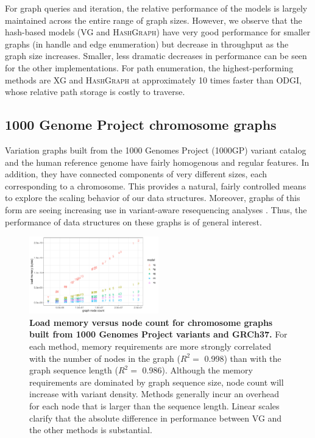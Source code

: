 \documentclass[11pt]{ucthesis}
\begin{document}
For graph queries and iteration, the relative performance of the models is largely maintained across the entire range of graph sizes.
However, we observe that the hash-based models (\textsc{VG} and \textsc{HashGraph}) have very good performance for smaller graphs (in handle and edge enumeration) but decrease in throughput as the graph size increases.
Smaller, less dramatic decreases in performance can be seen for the other implementations.
For path enumeration, the highest-performing methods are \textsc{XG} and \textsc{HashGraph} at approximately 10 times faster than \textsc{ODGI}, whose relative path storage is costly to traverse.

\subsection{1000 Genome Project chromosome graphs}

Variation graphs built from the 1000 Genomes Project (1000GP) variant catalog and the human reference genome have fairly homogenous and regular features.
In addition, they have connected components of very different sizes, each corresponding to a chromosome.
This provides a natural, fairly controlled means to explore the scaling behavior of our data structures.
Moreover, graphs of this form are seeing increasing use in variant-aware resequencing analyses \cite{crysnanto2019sequence}.
Thus, the performance of data structures on these graphs is of general interest.

\begin{figure}[p]
  \centering
  \includegraphics[width=0.5\textwidth]{handlefigures/1000gp_chroms_node_count.pdf}
  \caption{
    \label{fig:1000GPchroms}
    \textbf{Load memory versus node count for chromosome graphs built from 1000 Genomes Project variants and GRCh37.}
    For each method, memory requirements are more strongly correlated with the number of nodes in the graph ($R^2 =$ 0.998) than with the graph sequence length ($R^2 =$ 0.986).
    Although the memory requirements are dominated by graph sequence size, node count will increase with variant density.
    Methods generally incur an overhead for each node that is larger than the sequence length.
    Linear scales clarify that the absolute difference in performance between \textsc{VG} and the other methods is substantial.
    }
\end{figure}
\end{document}
